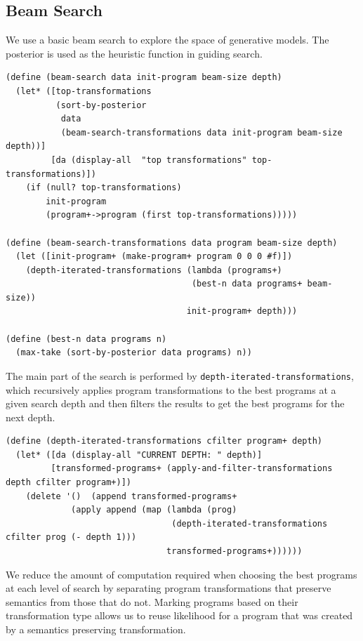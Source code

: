\documentclass[a4paper,10pt]{article}
\begin{document}
\subsection{Beam Search}
We use a basic beam search to explore the space of generative models.  The posterior is used as the heuristic function in guiding search.
\begin{verbatim}
(define (beam-search data init-program beam-size depth)
  (let* ([top-transformations 
          (sort-by-posterior
           data 
           (beam-search-transformations data init-program beam-size depth))]
         [da (display-all  "top transformations" top-transformations)])
    (if (null? top-transformations)
        init-program
        (program+->program (first top-transformations)))))

(define (beam-search-transformations data program beam-size depth)
  (let ([init-program+ (make-program+ program 0 0 0 #f)])
    (depth-iterated-transformations (lambda (programs+) 
                                     (best-n data programs+ beam-size)) 
                                    init-program+ depth)))

(define (best-n data programs n)
  (max-take (sort-by-posterior data programs) n))
\end{verbatim}
The main part of the search is performed by \texttt{depth-iterated-transformations}, which recursively applies program transformations to the best programs at a given search depth and then filters the results to get the best programs for the next depth.
\begin{verbatim}
(define (depth-iterated-transformations cfilter program+ depth)
  (let* ([da (display-all "CURRENT DEPTH: " depth)]
         [transformed-programs+ (apply-and-filter-transformations depth cfilter program+)])
    (delete '()  (append transformed-programs+
             (apply append (map (lambda (prog) 
                                 (depth-iterated-transformations cfilter prog (- depth 1))) 
                                transformed-programs+))))))
\end{verbatim}
We reduce the amount of computation required when choosing the best programs at each level of search by separating program transformations that preserve semantics from those that do not.  Marking programs based on their transformation type allows us to reuse likelihood for a program that was created by a semantics preserving transformation.
\end{document}
